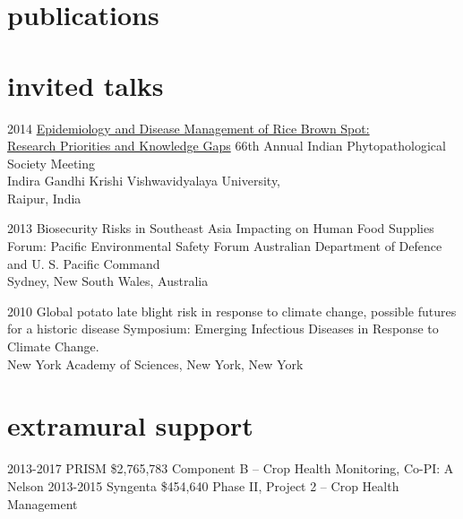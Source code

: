 \documentclass[]{friggeri-cv}
\begin{document}



\section{publications}

\begin{refsection}
  \nocite{*}
  \printbibliography[sorting=chronological, type=inproceedings, title={conferences/proceedings},  heading=subbibliography]
\end{refsection}
\begin{refsection}
  \nocite{*}
  \printbibliography[sorting=chronological, type=inbook, title={book chapters}, heading=subbibliography]
\end{refsection}
\begin{refsection}
  \nocite{*}
  \printbibliography[sorting=chronological, type=report, title={reports}, heading=subbibliography]
\end{refsection}

\section{invited talks}
\begin{entrylist}
 \entry
	{2014}
	{\href{http://figshare.com/articles/IPS_2014/1037569}{Epidemiology and Disease Management of Rice Brown Spot:\\Research Priorities and Knowledge Gaps}}
	{}
	{66th Annual Indian Phytopathological Society Meeting\\Indira Gandhi Krishi Vishwavidyalaya University,\\Raipur, India}

 \entry
	{2013}
	{Biosecurity Risks in Southeast Asia Impacting on Human Food Supplies}
	{}
	{Forum: Pacific Environmental Safety Forum Australian Department of Defence and U. S. Pacific Command\\Sydney, New South Wales, Australia}

 \entry
	 {2010} 
	{Global potato late blight risk in response to climate change, possible futures for a historic disease}
  	{}
  	{Symposium: Emerging Infectious Diseases in Response to Climate Change.\\New York Academy of Sciences, New York, New York}
\end{entrylist}

\section{extramural support}
  \begin{entrylist}
  \entry
	{2013-2017}
	{PRISM }
	{\$2,765,783}
	{Component B -- Crop Health Monitoring, Co-PI: A Nelson}
  \entry
	{2013-2015}
	{Syngenta}
	{\$454,640}
	{Phase II, Project 2 -- Crop Health Management}
  \end{entrylist}


\end{document}
